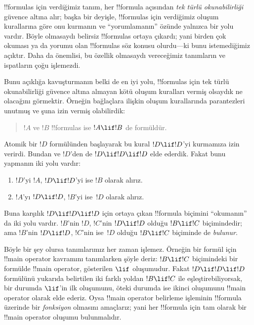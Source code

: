 



\begin{explain}
!!{formula}s için verdiğimiz tanım, her !!{formula} açısından \emph{tek türlü
okunabilirliği} güvence altına alır; başka bir deyişle, !!{formula}s için
verdiğimiz oluşum kurallarına göre onu kurmanın ve ``yorumlamanın'' özünde
yalnızca bir yolu vardır. Böyle olmasaydı belirsiz !!{formula}s ortaya
çıkardı; yani birden çok okuması ya da yorumu olan !!{formula}s söz konusu olurdu---ki
bunu istemediğimiz açıktır. Daha da önemlisi, bu özellik olmasaydı
vereceğimiz tanımların ve ispatların çoğu işlemezdi.

Bunu açıklığa kavuşturmanın belki de en iyi yolu, !!{formula}s için tek
türlü okunabilirliği güvence altına almayan kötü oluşum kuralları
vermiş olsaydık ne olacağını görmektir. Örneğin bağlaçlara ilişkin
oluşum kurallarında parantezleri unutmuş ve şuna izin vermiş
olabilirdik:
\begin{quote}
$!A$ ve $!B$ !!{formula}s ise $!A \lif !B$ de formüldür.
\end{quote}
Atomik bir $!D$ formülünden başlayarak bu kural $!D \lif !D$'yi
kurmamıza izin verirdi. Bundan ve $!D$'den de $!D \lif !D \lif !D$
elde ederdik. Fakat bunu yapmanın iki yolu vardır:
\begin{enumerate}
\item $!D$'yi $!A$, $!D \lif !D$'yi ise $!B$ olarak alırız.
\item $!A$'yı $!D \lif !D$, $!B$'yi ise~$!D$ olarak alırız.
\end{enumerate}
Buna karşılık $!D \lif !D \lif !D$ için ortaya çıkan !!{formula}
biçimini ``okumanın'' da iki yolu vardır. $!B$'nin $!D$, $!C$'nin $!D \lif !D$ olduğu $!B \lif !C$
biçimindedir; ama $!B$'nin $!D \lif !D$, $!C$'nin ise~$!D$ olduğu $!B
\lif !C$ biçiminde de \emph{bulunur}.

Böyle bir şey olursa tanımlarımız her zaman işlemez. Örneğin bir
formül için !!{main operator} kavramını tanımlarken şöyle deriz: $!B \lif !C$
biçimindeki bir formülde !!{main operator}, gösterilen $\lif$
oluşumudur. Fakat $!D \lif !D \lif !D$ formülünü yukarıda belirtilen iki
farklı yoldan $!B \lif !C$ ile eşleştirebiliyorsak, bir durumda
$\lif$'in ilk oluşumunu, öteki durumda ise ikinci oluşumunu !!{main
operator} olarak elde ederiz. Oysa !!{main operator} belirleme işleminin
!!{formula} üzerinde bir \emph{fonksiyon} olmasını amaçlarız; yani her !!{formula} için tam
olarak bir !!{main
  operator} oluşumu bulunmalıdır.
\end{explain}

